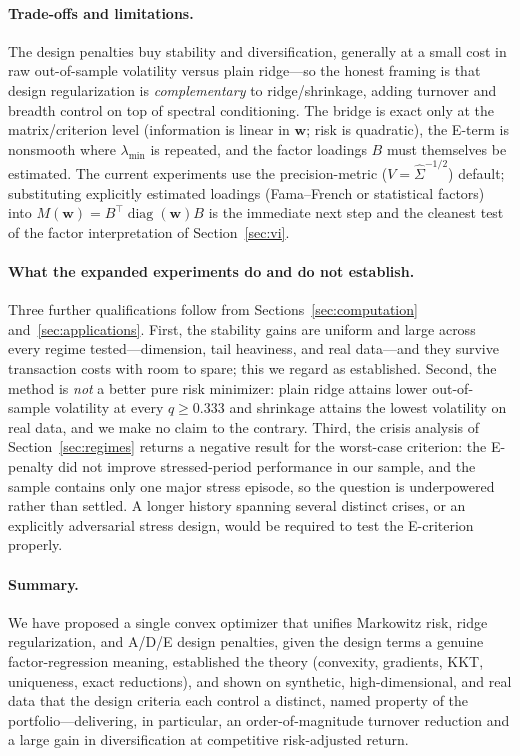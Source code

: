 \documentclass[11pt]{article}
\newcommand{\Sighat}{\hat\Sigma}
\newcommand{\diag}{\operatorname{diag}}
\newcommand{\w}{\mathbf{w}}
\newcommand{\M}{M(\w)}
\newcommand{\lammin}{\lambda_{\min}}
\begin{document}
\paragraph{Trade-offs and limitations.} The design penalties buy stability and
diversification, generally at a small cost in raw out-of-sample volatility versus
plain ridge---so the honest framing is that design regularization is
\emph{complementary} to ridge/shrinkage, adding turnover and breadth control on
top of spectral conditioning. The bridge is exact only at the matrix/criterion
level (information is linear in $\w$; risk is quadratic), the E-term is nonsmooth
where $\lammin$ is repeated, and the factor loadings $B$ must themselves be
estimated. The current experiments use the precision-metric ($V=\Sighat^{-1/2}$)
default; substituting explicitly estimated loadings (Fama--French or statistical
factors) into $\M=B^\top\diag(\w)B$ is the immediate next step and the cleanest
test of the factor interpretation of Section~\ref{sec:vi}.

\paragraph{What the expanded experiments do and do not establish.} Three further
qualifications follow from Sections~\ref{sec:computation}
and~\ref{sec:applications}. First, the stability gains are uniform and large
across every regime tested---dimension, tail heaviness, and real data---and they
survive transaction costs with room to spare; this we regard as established.
Second, the method is \emph{not} a better pure risk minimizer: plain ridge
attains lower out-of-sample volatility at every $q\ge0.333$ and shrinkage attains
the lowest volatility on real data, and we make no claim to the contrary. Third,
the crisis analysis of Section~\ref{sec:regimes} returns a negative result for
the worst-case criterion: the E-penalty did not improve stressed-period
performance in our sample, and the sample contains only one major stress episode,
so the question is underpowered rather than settled. A longer history spanning
several distinct crises, or an explicitly adversarial stress design, would be
required to test the E-criterion properly.

\paragraph{Summary.} We have proposed a single convex optimizer that unifies
Markowitz risk, ridge regularization, and A/D/E design penalties, given the
design terms a genuine factor-regression meaning, established the theory
(convexity, gradients, KKT, uniqueness, exact reductions), and shown on synthetic,
high-dimensional, and real data that the design criteria each control a distinct,
named property of the portfolio---delivering, in particular, an order-of-magnitude
turnover reduction and a large gain in diversification at competitive
risk-adjusted return.



\end{document}
